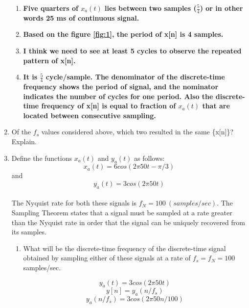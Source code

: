 \documentclass[12pt]{article}
\begin{document}
\begin{enumerate}



\begin{enumerate}
\item \textbf{Five quarters of $x_a(t)$ lies between two samples ($\frac{5}{4}$) or in other words 25 ms of continuous signal.}

\item \textbf{Based on the figure \ref{fig:1}, the period of x[n] is 4 samples.}

\item \textbf{I think we need to see at least 5 cycles to observe the repeated pattern of x[n].}

\item \textbf{It is $\frac{5}{4}$ cycle/sample. The denominator of the discrete-time frequency shows the period of signal, and the nominator indicates the number of cycles for one period. Also the discrete-time frequency of x[n] is equal to fraction of $x_a(t)$ that are located between consecutive sampling.}
\end{enumerate}


\item Of the $f_s$ values considered above, which two resulted in the same \{x[n]\}? Explain.



\item Define the functions $x_a(t)$ and $y_a(t)$ as follows:\\
$$x_a(t) = 6 cos(2\pi50t - \pi/3)$$ and $$y_a(t) = 3 cos(2\pi50t)$$\\
The Nyquist rate for both these signals is $f_N = 100\ (samples/sec)$. The Sampling Theorem states that a signal must be sampled at a rate greater than the Nyquist rate in order that the signal can be uniquely recovered from its samples.


\begin{enumerate}
\item What will be the discrete-time frequency of the discrete-time signal obtained by sampling either of these signals at a rate of $f_s = f_N = 100$ samples/sec.

$$y_a(t) = 3 cos(2\pi50t)$$
$$y[n] = y_a(n/f_s)$$
$$y_a(n/f_s) = 3 cos(2\pi50n/100)$$


\end{enumerate}
\end{enumerate}
\end{document}
